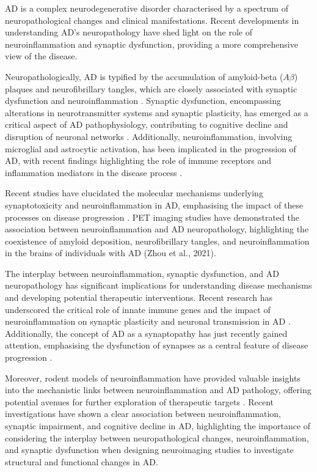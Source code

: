 \documentclass[10pt]{article}
\begin{document}
\begin{sloppypar}
  AD is a complex neurodegenerative disorder characterised by a spectrum of neuropathological changes and clinical manifestations. Recent developments in understanding AD's neuropathology have shed light on the role of neuroinflammation and synaptic dysfunction, providing a more comprehensive view of the disease.

  Neuropathologically, AD is typified by the accumulation of amyloid-beta ($A\beta$) plaques and neurofibrillary tangles, which are closely associated with synaptic dysfunction and neuroinflammation \citep{heneka_neuroinflammation_2015}. Synaptic dysfunction, encompassing alterations in neurotransmitter systems and synaptic plasticity, has emerged as a critical aspect of AD pathophysiology, contributing to cognitive decline and disruption of neuronal networks \citep{heneka_neuroinflammation_2015}. Additionally, neuroinflammation, involving microglial and astrocytic activation, has been implicated in the progression of AD, with recent findings highlighting the role of immune receptors and inflammation mediators in the disease process \citep{heneka_neuroinflammation_2015}.

  Recent studies have elucidated the molecular mechanisms underlying synaptotoxicity and neuroinflammation in AD, emphasising the impact of these processes on disease progression \citep{marttinen_molecular_2018}. PET imaging studies have demonstrated the association between neuroinflammation and AD neuropathology, highlighting the coexistence of amyloid deposition, neurofibrillary tangles, and neuroinflammation in the brains of individuals with AD (Zhou et al., 2021).

  The interplay between neuroinflammation, synaptic dysfunction, and AD neuropathology has significant implications for understanding disease mechanisms and developing potential therapeutic interventions. Recent research has underscored the critical role of innate immune genes and the impact of neuroinflammation on synaptic plasticity and neuronal transmission in AD \citep{ransohoff_how_2016}. Additionally, the concept of AD as a synaptopathy has just recently gained attention, emphasising the dysfunction of synapses as a central feature of disease progression \citep{meftah_alzheimers_2023}.

  Moreover, rodent models of neuroinflammation have provided valuable insights into the mechanistic links between neuroinflammation and AD pathology, offering potential avenues for further exploration of therapeutic targets \citep{nazem_rodent_2015}. Recent investigations have shown a clear association between neuroinflammation, synaptic impairment, and cognitive decline in AD, highlighting the importance of considering the interplay between neuropathological changes, neuroinflammation, and synaptic dysfunction when designing neuroimaging studies to investigate structural and functional changes in AD.


\end{sloppypar}
\end{document}
